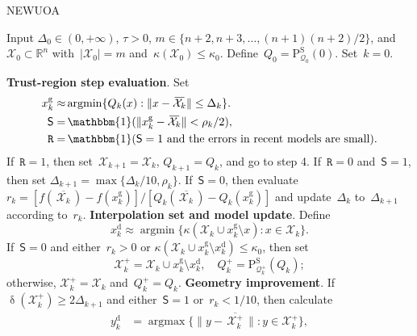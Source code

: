 \documentclass[11pt,a4paper,draft]{article}  %
\theoremstyle{definition}
\numberwithin{equation}{section}
\newcommand{\mbar}[1]{\,\overline{\!{#1}\!}\,} %
\newcommand{\xopt}{\mbar}
\DeclareMathOperator{\xdist}{\updelta}
\DeclareMathOperator*{\argmax}{argmax}
\DeclareMathOperator*{\argmin}{argmin}
\DeclareMathOperator{\ind}{\mathbbm{1}}
\newcommand{\shortd}{\mathsf{S}}
\newcommand{\redrho}{\mathtt{R}}
\newcommand{\RR}{\mathbb{R}}
\newcommand{\Int}{\mathcal{X}}
\newcommand{\Qua}{\mathcal{Q}}
\newcommand{\sss}[1]{{\scriptscriptstyle{#1}}}
\newcommand{\get}{{\textrm{g}}}
\newcommand{\drop}{{\textrm{d}}}
\newcommand{\new}{{\sss{+}}}
\newcommand{\sob}{{\scriptscriptstyle{\textrm{S}}}}
\newcommand{\Projs}{\mathrm{P}^\sob}
\begin{document}
\begin{algorithm}[htbp!]
    \caption{\label{alg:newuoa}NEWUOA}
    Input $\Delta_0\in (0,+\infty)$, $\tau>0$, $m\in \{n+2, n+3, \dots, (n+1)(n+2)/2\}$,
    and~$\Int_0\subset \RR^n$ with~$|\Int_0|=m$ and~$\kappa(\Int_0) \le \kappa_0$.
    Define~$Q_0 = \Projs_{\Qua_0}(0)$.
    Set~$k=0$.
    \begin{algorithmic}[1]
        \State \textbf{Trust-region step evaluation}.
        Set
        \begin{align}
             \label{eq:xgetn}
             x_k^\get \approx &\argmin\{Q_k(x)\mathrel{:} \|x-\xopt{\Int_k}\|\le \Delta_k\}.\\
            \label{eq:shortd}
            \shortd = &\ind(\|x_k^\get-\xopt{\Int_k}\| < \rho_k/2),\\
            \label{eq:redrho}
            \redrho = & \ind(\shortd=1\text{ and the errors in recent models are small}).
        \end{align}
        If~$\redrho = 1$, then set~$\Int_{k+1} = \Int_k$, $Q_{k+1} = Q_k$, and go to step 4.
        If~$\redrho = 0$ and~$\shortd = 1$, then set $\Delta_{k+1} = \max\{\Delta_k/10, \rho_k\}$.
        If~$\shortd = 0$, then evaluate $r_k = [f(\xopt{\Int_k})-f(x_k^\get)]/[Q_k(\xopt{\Int_k})-Q_k(x_k^\get)]$ and update~$\Delta_k$ to~$\Delta_{k+1}$ according to~$r_k$.
        \State \textbf{Interpolation set and model update}.
        Define
        \begin{equation}
            \label{eq:xdropn}
            x_k^\drop \approx \argmin\{\kappa(\Int_k\cup x_k^\get\setminus x) \mathrel{:} x \in
            \Int_k\}.
        \end{equation}
        If~$\shortd = 0$ and either~$r_k>0$ or $\kappa(\Int_k\cup x_k^\get \setminus x_k^\drop) \le
        \kappa_0$, then set
        \begin{equation}
            \label{eq:updateq1}
            \Int^{\new}_{k} = \Int_k\cup x_k^\get\setminus x_k^\drop, \quad
            {Q}^{\new}_k = \Projs_{\Qua_k^\new}(Q_k);
        \end{equation}
        otherwise, $\Int_k^\new = \Int_k$ and~$Q_k^\new =Q_k$.
        \State \textbf{Geometry improvement}.
        If~$\xdist(\Int^\new_k)\ge 2\Delta_{k+1}$ and either~$\shortd = 1$ or~$r_k < 1/10$, then
        calculate
          \begin{align}
              \label{eq:ydropn}
              y_k^\drop &= \argmax\{\|y-\xopt{\Int^{\new}_k}\| \mathrel{:} y \in \Int^{\new}_k\},\\

\end{align}
\end{algorithmic}
\end{algorithm}
\end{document}
